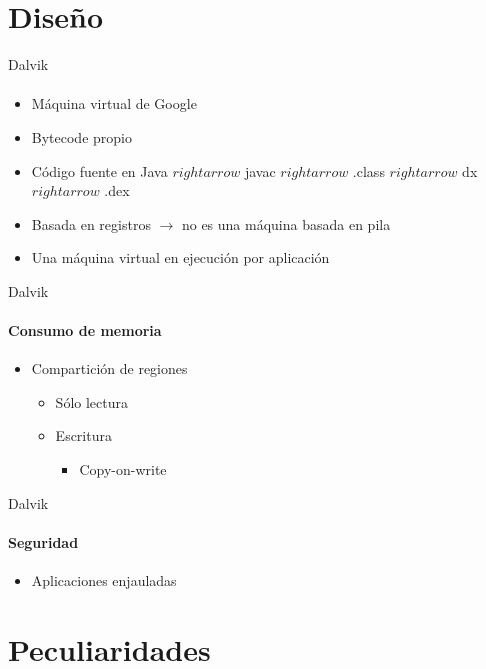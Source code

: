 \documentclass[12pt]{beamer}
\begin{document}
\section{Diseño}

\begin{frame}{Dalvik}
    \framesubtitle{}
    \begin{itemize}
        \item Máquina virtual de Google
        \item Bytecode propio
        \item Código fuente en Java $rightarrow$ javac $rightarrow$ .class $rightarrow$ dx $rightarrow$ .dex
        \item Basada en registros $\rightarrow$ no es una máquina basada en pila
        \item Una máquina virtual en ejecución por aplicación
    \end{itemize}
\end{frame}

\begin{frame}{Dalvik}
    \framesubtitle{Consumo de memoria}
    \begin{itemize}
        \item Compartición de regiones
        \begin{itemize}
            \item Sólo lectura
            \item Escritura
            \begin{itemize}
                \item Copy-on-write
            \end{itemize}
        \end{itemize}
    \end{itemize}
\end{frame}

\begin{frame}{Dalvik}
    \framesubtitle{Seguridad}
    \begin{itemize}
        \item Aplicaciones enjauladas
    \end{itemize}
\end{frame}

\section{Peculiaridades}
\end{document}
